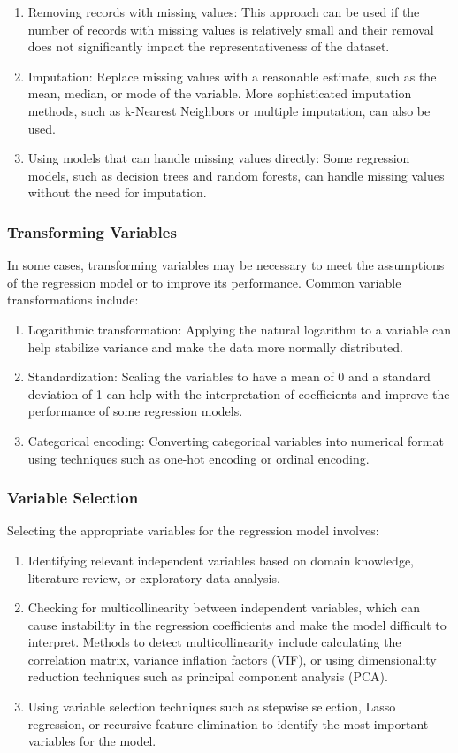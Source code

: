 \documentclass{beamer}
\begin{document}
\begin{enumerate}
\item Removing records with missing values: This approach can be used if the number of records with missing values is relatively small and their removal does not significantly impact the representativeness of the dataset.
\item Imputation: Replace missing values with a reasonable estimate, such as the mean, median, or mode of the variable. More sophisticated imputation methods, such as k-Nearest Neighbors or multiple imputation, can also be used.
\item Using models that can handle missing values directly: Some regression models, such as decision trees and random forests, can handle missing values without the need for imputation.
\end{enumerate}

\subsubsection{Transforming Variables}
In some cases, transforming variables may be necessary to meet the assumptions of the regression model or to improve its performance. Common variable transformations include:

\begin{enumerate}
\item Logarithmic transformation: Applying the natural logarithm to a variable can help stabilize variance and make the data more normally distributed.
\item Standardization: Scaling the variables to have a mean of 0 and a standard deviation of 1 can help with the interpretation of coefficients and improve the performance of some regression models.
\item Categorical encoding: Converting categorical variables into numerical format using techniques such as one-hot encoding or ordinal encoding.
\end{enumerate}

\subsubsection{Variable Selection}
Selecting the appropriate variables for the regression model involves:

\begin{enumerate}
\item Identifying relevant independent variables based on domain knowledge, literature review, or exploratory data analysis.
\item Checking for multicollinearity between independent variables, which can cause instability in the regression coefficients and make the model difficult to interpret. Methods to detect multicollinearity include calculating the correlation matrix, variance inflation factors (VIF), or using dimensionality reduction techniques such as principal component analysis (PCA).
\item Using variable selection techniques such as stepwise selection, Lasso regression, or recursive feature elimination to identify the most important variables for the model.
\end{enumerate}
\end{document}
